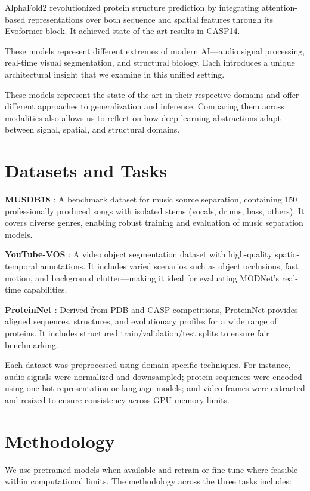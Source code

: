 \documentclass{article}
\begin{document}
AlphaFold2 revolutionized protein structure prediction by integrating attention-based representations over both sequence and spatial features through its Evoformer block. It achieved state-of-the-art results in CASP14.

These models represent different extremes of modern AI—audio signal processing, real-time visual segmentation, and structural biology. Each introduces a unique architectural insight that we examine in this unified setting.

These models represent the state-of-the-art in their respective domains and offer different approaches to generalization and inference. Comparing them across modalities also allows us to reflect on how deep learning abstractions adapt between signal, spatial, and structural domains.

\section{Datasets and Tasks}

\textbf{MUSDB18} : A benchmark dataset for music source separation, containing 150 professionally produced songs with isolated stems (vocals, drums, bass, others). It covers diverse genres, enabling robust training and evaluation of music separation models.

\textbf{YouTube-VOS} : A video object segmentation dataset with high-quality spatio-temporal annotations. It includes varied scenarios such as object occlusions, fast motion, and background clutter---making it ideal for evaluating MODNet's real-time capabilities.

\textbf{ProteinNet} : Derived from PDB and CASP competitions, ProteinNet provides aligned sequences, structures, and evolutionary profiles for a wide range of proteins. It includes structured train/validation/test splits to ensure fair benchmarking.

Each dataset was preprocessed using domain-specific techniques. For instance, audio signals were normalized and downsampled; protein sequences were encoded using one-hot representation or language models; and video frames were extracted and resized to ensure consistency across GPU memory limits.

\section{Methodology}

We use pretrained models when available and retrain or fine-tune where feasible within computational limits. The methodology across the three tasks includes:
\end{document}
